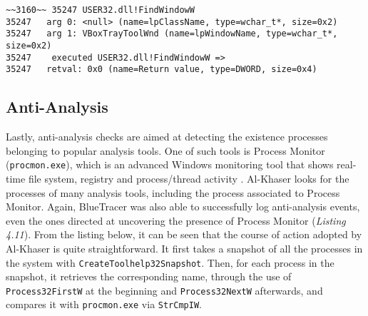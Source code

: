 \vspace{0.5cm}
\begin{lstlisting}[caption={ Log entry relative to \texttt{FindWindowW}},captionpos=b]
~~3160~~ 35247 USER32.dll!FindWindowW
35247 	arg 0: <null> (name=lpClassName, type=wchar_t*, size=0x2)
35247 	arg 1: VBoxTrayToolWnd (name=lpWindowName, type=wchar_t*, size=0x2)
35247    executed USER32.dll!FindWindowW =>
35247 	retval: 0x0 (name=Return value, type=DWORD, size=0x4)
\end{lstlisting}

\subsection{Anti-Analysis}

\iffalse
Check for processes of common anti-analysis tools
\fi

Lastly, anti-analysis checks are aimed at detecting the existence processes belonging to popular analysis tools. One of such tools is Process Monitor (\texttt{procmon.exe}), which is an advanced Windows monitoring tool that shows real-time file system, registry and process/thread activity \cite{procmon}. Al-Khaser looks for the processes of many analysis tools, including the process associated to Process Monitor. Again, BlueTracer was also able to successfully log anti-analysis events, even the ones directed at uncovering the presence of Process Monitor (\textit{Listing 4.11}). From the listing below, it can be seen that the course of action adopted by Al-Khaser is quite straightforward. It first takes a snapshot of all the processes in the system with \texttt{CreateToolhelp32Snapshot}. Then, for each process in the snapshot, it retrieves the corresponding name, through the use of \texttt{Process32FirstW} at the beginning and \texttt{Process32NextW} afterwards, and compares it with \texttt{procmon.exe} via \texttt{StrCmpIW}. 

